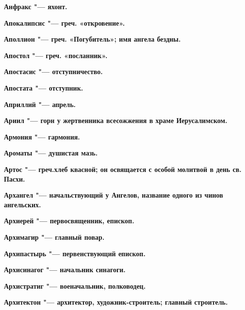 \begin{mymulticols}{2}
\bfseries Анфракс\normalfont{} "--- яхонт. 




\bfseries Апокалипсис\normalfont{} "--- греч. «откровение». 




\bfseries Аполлион\normalfont{} "--- греч. «Погубитель»; имя ангела бездны. 




\bfseries Апостол\normalfont{} "--- греч. «посланник». 




\bfseries Апостасис\normalfont{} "--- отступничество. 




\bfseries Апостата\normalfont{} "--- отступник. 




\bfseries Априллий\normalfont{} "--- апрель. 




\bfseries Ариил\normalfont{} "--- горн у жертвенника всесожжения в храме Иерусалимском. 




\bfseries Армония\normalfont{} "--- гармония. 




\bfseries Ароматы\normalfont{} "--- душистая мазь. 




\bfseries Артос\normalfont{} "--- греч.хлеб квасной; он освящается с особой молитвой в день св. Пасхи. 




\bfseries Архангел\normalfont{} "--- начальствующий у Ангелов, название одного из чинов ангельских. 




\bfseries Архиерей\normalfont{} "--- первосвященник, епископ. 




\bfseries Архимагир\normalfont{} "--- главный повар. 




\bfseries Архипастырь\normalfont{} "--- первенствующий епископ. 




\bfseries Архисинагог\normalfont{} "--- начальник синагоги. 




\bfseries Архистратиг\normalfont{} "--- военачальник, полководец. 




\bfseries Архитектон\normalfont{} "--- архитектор, художник-строитель; главный строитель. 





\end{mymulticols}
